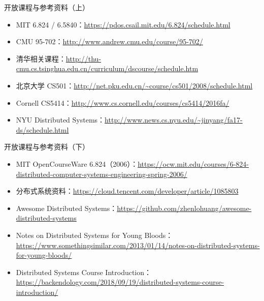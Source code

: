 \documentclass[UTF8,fontset=none,aspectratio=169,10pt]{beamer}
\begin{document}
\begin{frame}{开放课程与参考资料（上）}
\scriptsize
\begin{itemize}
  \item MIT 6.824 / 6.5840：\url{https://pdos.csail.mit.edu/6.824/schedule.html}
  \item CMU 95-702：\url{http://www.andrew.cmu.edu/course/95-702/}
  \item 清华相关课程：\url{http://thu-cmu.cs.tsinghua.edu.cn/curriculum/dscourse/schedule.htm}
  \item 北京大学 CS501：\url{http://net.pku.edu.cn/~course/cs501/2008/schedule.html}
  \item Cornell CS5414：\url{http://www.cs.cornell.edu/courses/cs5414/2016fa/}
  \item NYU Distributed Systems：\url{http://www.news.cs.nyu.edu/~jinyang/fa17-ds/schedule.html}
\end{itemize}
\vfill
{}
\end{frame}

\begin{frame}{开放课程与参考资料（下）}
\scriptsize
\begin{itemize}
  \item MIT OpenCourseWare 6.824（2006）：\url{https://ocw.mit.edu/courses/6-824-distributed-computer-systems-engineering-spring-2006/}
  \item 分布式系统资料：\url{https://cloud.tencent.com/developer/article/1085803}
  \item Awesome Distributed Systems：\url{https://github.com/zhenlohuang/awesome-distributed-systems}
  \item Notes on Distributed Systems for Young Bloods：\url{https://www.somethingsimilar.com/2013/01/14/notes-on-distributed-systems-for-young-bloods/}
  \item Distributed Systems Course Introduction：\url{https://backendology.com/2018/09/19/distributed-systems-course-introduction/}
\end{itemize}
\vfill
{}
\end{frame}
\end{document}
